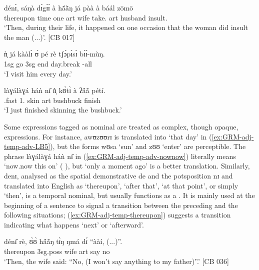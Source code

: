 \begin{exe}
\begin{exe}
\begin{exe}
\ex\label{ex:GRM-adj-temp-adv-CB17}
\gll {\ob}dénɪ̀{\cb},   {\ob}sáŋà   dɪ́gɪ́ɪ́{\cb}   à   hã́ã̀ŋ já   pàà à  báál   zōmō\\
thereupon time one   {\sc art}  wife  {\hab}   take.{\pl} {\sc art} husband insult.{\pl} \\
\glt `Then, during their life, it happened on one occasion that the woman
did insult  the man (...)'.  [CB 017]

\ex\label{ex:GRM-adj-temp-adv-everyday}
\gll  ǹ̩ já kààlɪ̀ ʊ̀ pé rè {\ob}{tʃɔ̀pɪ̀sɪ̀} bɪ́ɪ́-mùŋ{\cb}.\\
 {\sc 1sg} {\hab} go {\sc 3sg} end {\foc} day.break {\itr}-all\\
\glt `I visit him every day.'

\ex\label{ex:GRM-adj-temp-adv-nownow}
\gll {\ob}làɣálàɣá háǹ nɪ̄{\cb} ǹ̩ kʊ̀tɪ̀ à ʔã́ã́ pétí.\\
{\ideo}.fast {\dem} {\postp} {1.\sg} {skin} {\sc art} bushbuck  finish\\
\glt `I  just finished skinning the bushbuck.'


\z 
 \z


Some expressions tagged as  nominal are treated as complex, though opaque, expressions. For 
instance,  {\sls awʊzʊʊrɪ} is translated into  `that day' in (\ref{ex:GRM-adj-temp-adv-LB5}), 
but the forms {\sls wʊsa} `sun' and {\sls zʊʊ} `enter'  are perceptible. The phrase {\sls 
làɣálàɣá háǹ nɪ̄} in (\ref{ex:GRM-adj-temp-adv-nownow}) literally means `now.now this on' 
({\ideo} {\dem} {\postp}), but `only a moment ago'  is a better translation.  Similarly, {\sls 
denɪ}, analysed as the spatial demonstrative {\sls de} and the potsposition {\sls nɪ} and  
translated into English as `thereupon', `after that', `at that point', or simply `then',  is  a 
temporal nominal, but usually functions as a .  It is mainly used at the beginning of a 
sentence to signal a transition  between the preceding  and the following situations; 
(\ref{ex:GRM-adj-temp-thereupon}) suggests a transition  indicating what happens `next' or 
`afterward'.


\ea\label{ex:GRM-adj-temp-thereupon}
\gll dénɪ̄   rè,     ʊ̀ʊ̀      hã́ã́ŋ   tɪ̀ŋ ŋmá   dɪ́  ``ààí, (...)''.\\
 thereupon   {\foc}  {\sc 3sg.poss}  wife  {\sc art}  say   {\comp} no {}\\
\glt `Then, the wife said: ``No, (I won't
say anything to my father)''.' [CB 036]
\z


\end{exe}
\end{exe}
\end{exe}
